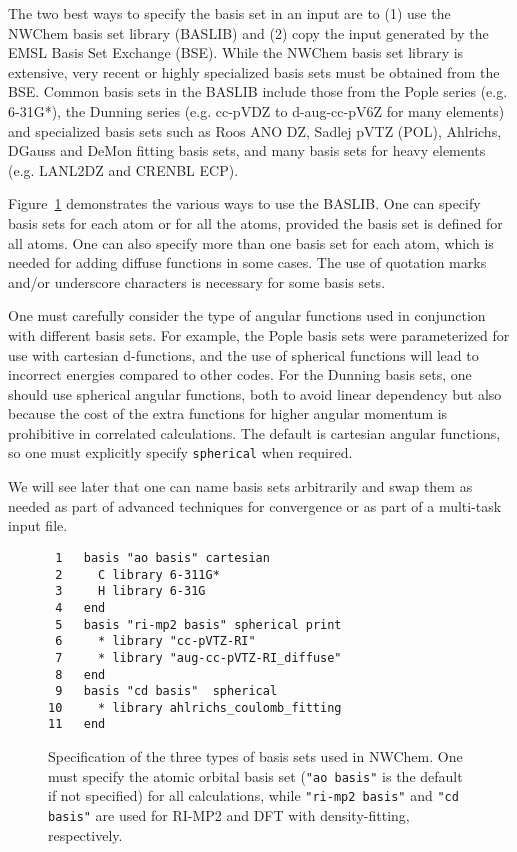 \documentclass[letterpaper,12pt]{article}
\begin{document}
The two best ways to specify the basis set in an input are to (1) use the NWChem basis set library (BASLIB) and (2) copy the input generated by the EMSL Basis Set Exchange (BSE).  While the NWChem basis set library is extensive, very recent or highly specialized basis sets must be obtained from the BSE.  Common basis sets in the BASLIB include those from the Pople series (e.g. 6-31G*), the Dunning series (e.g. cc-pVDZ to d-aug-cc-pV6Z for many elements) and specialized basis sets such as Roos ANO DZ, Sadlej pVTZ (POL), Ahlrichs, DGauss and DeMon fitting basis sets, and many basis sets for heavy elements (e.g. LANL2DZ and CRENBL ECP).

Figure~\ref{fig:BasisLibrary} demonstrates the various ways to use the BASLIB.  One can specify basis sets for each atom or for all the atoms, provided the basis set is defined for all atoms.  One can also specify more than one basis set for each atom, which is needed for adding diffuse functions in some cases.  The use of quotation marks and/or underscore characters is necessary for some basis sets.

One must carefully consider the type of angular functions used in conjunction with different basis sets.  For example, the Pople basis sets were parameterized for use with cartesian d-functions, and the use of spherical functions will lead to incorrect energies compared to other codes.  For the Dunning basis sets, one should use spherical angular functions, both to avoid linear dependency but also because the cost of the extra functions for higher angular momentum is prohibitive in correlated calculations.  The default is cartesian angular functions, so one must explicitly specify \texttt{spherical} when required.

We will see later that one can name basis sets arbitrarily and swap them as needed as part of advanced techniques for convergence or as part of a multi-task input file.

\begin{figure}
    \caption{Specification of the three types of basis sets used in NWChem.  One must specify the atomic orbital basis set (\texttt{"ao basis"} is the default if not specified) for all calculations, while \texttt{"ri-mp2 basis"} and \texttt{"cd basis"} are used for RI-MP2 and DFT with density-fitting, respectively.}
    \label{fig:BasisLibrary}
    \begin{verbatim}
 1   basis "ao basis" cartesian
 2     C library 6-311G*
 3     H library 6-31G
 4   end
 5   basis "ri-mp2 basis" spherical print
 6     * library "cc-pVTZ-RI"
 7     * library "aug-cc-pVTZ-RI_diffuse"
 8   end
 9   basis "cd basis"  spherical
10     * library ahlrichs_coulomb_fitting
11   end
    \end{verbatim}
\end{figure}
\end{document}
